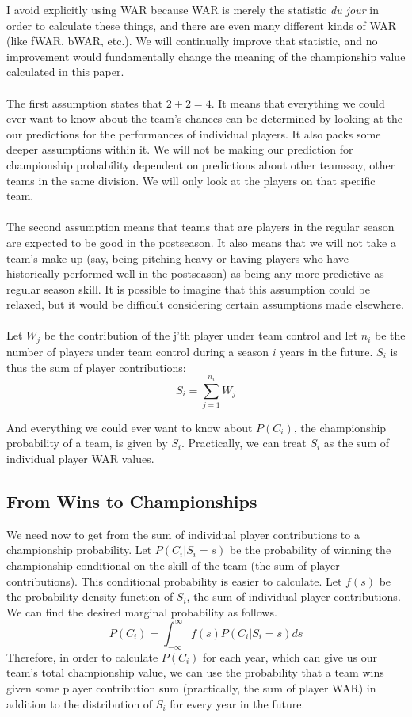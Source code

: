 \documentclass[11pt]{article}
\begin{document}
I avoid explicitly using WAR because WAR is merely the statistic \textit{du jour} in order to calculate these things, and there are even many different kinds of WAR (like fWAR, bWAR, etc.). We will continually improve that statistic, and no improvement would fundamentally change the meaning of the championship value calculated in this paper.\\\\
The first assumption states that $2 + 2 = 4$. It means that everything we could ever want to know about the team's chances can be determined by looking at the our predictions for the performances of individual players. It also packs some deeper assumptions within it. We will not be making our prediction for championship probability dependent on predictions about other teams\textemdash say, other teams in the same division. We will only look at the players on that specific team.\\\\
The second assumption means that teams that are players in the regular season are expected to be good in the postseason. It also means that we will not take a team's make-up (say, being pitching heavy or having players who have historically performed well in the postseason) as being any more predictive as regular season skill. It is possible to imagine that this assumption could be relaxed, but it would be difficult considering certain assumptions made elsewhere.\\\\
Let $W_j$ be the contribution of the j'th player under team control and let $n_i$ be the number of players under team control during a season $i$ years in the future. $S_i$ is thus the sum of player contributions:
$$S_i = \sum_{j=1}^{n_i}{W_j}$$

And everything we could ever want to know about $P(C_i)$, the championship probability of a team, is given by $S_i$. Practically, we can treat $S_i$ as the sum of individual player WAR values.

\subsection{From Wins to Championships}

We need now to get from the sum of individual player contributions to a championship probability. Let $P(C_i | S_i = s)$ be the probability of winning the championship conditional on the skill of the team (the sum of player contributions). This conditional probability is easier to calculate. Let $f(s)$ be the probability density function of $S_i$, the sum of individual player contributions. We can find the desired marginal probability as follows.
$$P(C_i) = \int_{-\infty}^{\infty}f(s) P(C_i|S_i=s)ds$$
Therefore, in order to calculate $P(C_i)$ for each year, which can give us our team's total championship value, we can use the probability that a team wins given some player contribution sum (practically, the sum of player WAR) in addition to the distribution of $S_i$ for every year in the future.
\end{document}
